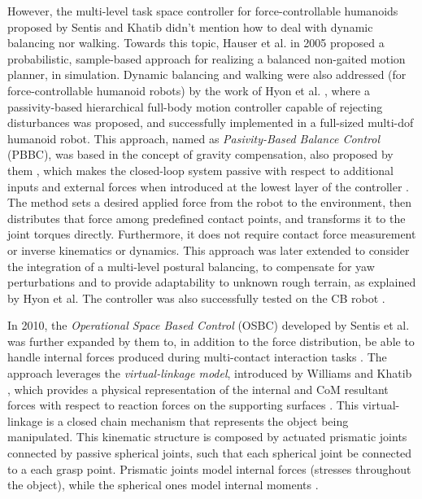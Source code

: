 	However, the multi-level task space controller for force-controllable humanoids proposed by
	Sentis and Khatib \cite{Sentis_ICRA2006} didn't mention how to deal with dynamic balancing
	nor walking.
	Towards this topic, Hauser et al. \cite{Hauser_Humanoids2005} in 2005 proposed a probabilistic,
	sample-based approach for realizing a balanced non-gaited motion planner, in simulation.
	Dynamic balancing and walking were also addressed (for force-controllable humanoid robots) by the
	work of Hyon et al. \cite{Hyon_IROS2006} \cite{Hyon_ICRA2007} \cite{Hyon_TransRobotics2007},
	where a passivity-based hierarchical full-body motion controller capable of	rejecting disturbances
	was proposed, and successfully implemented in a full-sized multi-dof humanoid robot.
	This approach, named as \emph{Pasivity-Based Balance Control} (PBBC), was based in the concept of
	gravity compensation, also proposed by them	\cite{Hyon_Humanoids2006}, which makes the closed-loop
	system passive with respect to	additional inputs and external forces when introduced at the lowest
	layer of the controller \cite{Hyon_IROS2006}.
	The method sets a desired applied force from the robot to the environment, then distributes that force
	among predefined contact points, and transforms it to the joint torques directly.
	Furthermore, it does not require contact force measurement or inverse kinematics or dynamics.
	This approach was later extended to consider the integration of a multi-level postural balancing,
	to compensate for yaw perturbations and to provide adaptability to unknown rough terrain,
	as explained by Hyon et al. \cite{Hyon_ICRA2009} \cite{Hyon_TransRobotics2009}
	The controller was also successfully tested on the CB robot \cite{Ott_Humanoids2011}.
	
	In 2010, the \emph{Operational Space Based Control} (OSBC) developed by Sentis et al.
	\cite{Sentis_MotionPlan2010} was further expanded by them \cite{Sentis_TransRobotics2010} to,
	in addition to the force distribution, be able to handle internal forces produced during
	multi-contact interaction tasks	\cite{Ott_Humanoids2011}.
	The approach leverages the \emph{virtual-linkage model}, introduced by Williams and Khatib
	\cite{Williams_ICRA1993}, which provides a physical representation of the internal and CoM
	resultant forces with respect to reaction forces on the supporting surfaces
	\cite{Sentis_TransRobotics2010}.
	This virtual-linkage is a closed chain mechanism that represents the object being manipulated.
	This kinematic structure is composed by actuated prismatic joints connected by passive spherical
	joints, such that each spherical joint be connected to a each grasp point.
	Prismatic joints model internal forces (stresses throughout the object), while the spherical ones
	model internal moments \cite{Williams_ICRA1993}.
	
